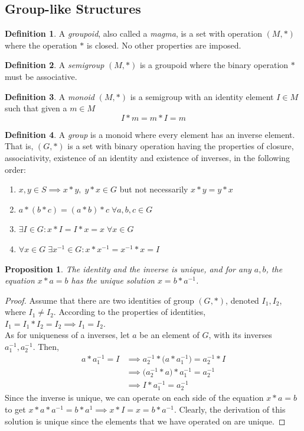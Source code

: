 \documentclass{article}
\newtheorem{proposition}[theorem]{Proposition}
\theoremstyle{remark}
\theoremstyle{definition}
\newtheorem{definition}{Definition}[section]
\begin{document}
\subsection{Group-like Structures}
\begin{definition}
A \textit{groupoid}, also called a \textit{magma}, is a set with operation $(M, *)$ where the operation $*$ is closed. No other properties are imposed. 
\end{definition}

\begin{definition}
A \textit{semigroup} $(M, *)$ is a groupoid where the binary operation $*$ must be associative.  
\end{definition}

\begin{definition}
A \textit{monoid} $(M, *)$ is a semigroup with an identity element $I \in M$ such that given a $m \in M$
\[I * m = m * I = m \]
\end{definition}

\begin{definition}
A \textit{group} is a monoid where every element has an inverse element. That is, $(G, *)$ is a set with binary operation having the properties of closure, associativity, existence of an identity and existence of inverses, in the following order: 
\begin{enumerate}
    \item $x, y \in S \implies x*y, \;y*x \in G$ but not necessarily $x*y  = y*x$
    \item $a*(b*c) = (a*b)*c \; \forall a, b, c \in G$
    \item $\exists I \in G : x*I = I*x = x \; \forall x \in G $
    \item $\forall x \in G \; \exists x^{-1} \in G : x * x^{-1} = x^{-1} * x = I$
\end{enumerate}
\end{definition}

\begin{proposition}
The identity and the inverse is unique, and for any $a, b$, the equation $x*a = b$ has the unique solution $x = b* a^{-1}$.
\end{proposition}
\begin{proof}
 Assume that there are two identities of group $(G,*)$, denoted $I_{1}, I_{2}$, where $I_{1} \neq I_{2}$. According to the properties of identities, $I_{1} = I_{1} * I_{2} = I_{2} \implies I_{1} = I_{2}$. \\
As for uniqueness of a inverses, let $a$ be an element of $G$, with its inverses $a_{1}^{-1}, a_{2}^{-1}$. Then, 
\begin{align*}
a * a_{1}^{-1} = I & \implies a_{2}^{-1} * \Big(a * a_{1}^{-1} \Big)= a_{2}^{-1} * I \\
 & \implies \Big(a_{2}^{-1} * a \Big) * a_{1}^{-1} = a_{2}^{-1} \\
 & \implies I * a_{1}^{-1} = a_{2}^{-1}
\end{align*}
Since the inverse is unique, we can operate on each side of the equation $x*a = b$ to get $x*a*a^{-1} = b*a^{1} \implies x * I = x = b*a^{-1}$. Clearly, the derivation of this solution is unique since the elements that we have operated on are unique.
\end{proof}
\end{document}
